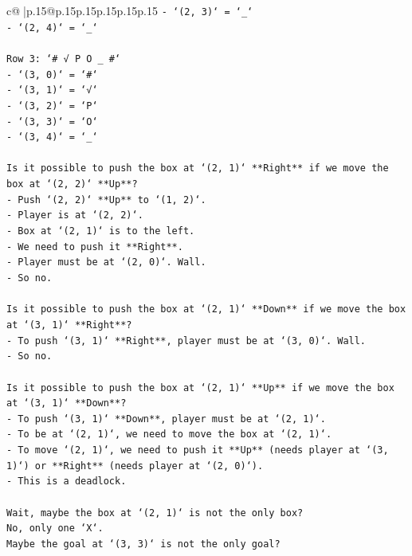 \documentclass{article}
\begin{document}
{\begin{supertabular}{c@{$\;$}|p{.15\linewidth}@{}p{.15\linewidth}p{.15\linewidth}p{.15\linewidth}p{.15\linewidth}p{.15\linewidth}}
{{{\texttt{{-} `(2, 3)` = `\_`} \\
\texttt{{-} `(2, 4)` = `\_`} \\
\\ 
\texttt{Row 3: `\# √ P O \_ \#`} \\
\texttt{{-} `(3, 0)` = `\#`} \\
\texttt{{-} `(3, 1)` = `√`} \\
\texttt{{-} `(3, 2)` = `P`} \\
\texttt{{-} `(3, 3)` = `O`} \\
\texttt{{-} `(3, 4)` = `\_`} \\
\\ 
\texttt{Is it possible to push the box at `(2, 1)` **Right** if we move the box at `(2, 2)` **Up**?} \\
\texttt{{-} Push `(2, 2)` **Up** to `(1, 2)`.} \\
\texttt{{-} Player is at `(2, 2)`.} \\
\texttt{{-} Box at `(2, 1)` is to the left.} \\
\texttt{{-} We need to push it **Right**.} \\
\texttt{{-} Player must be at `(2, 0)`. Wall.} \\
\texttt{{-} So no.} \\
\\ 
\texttt{Is it possible to push the box at `(2, 1)` **Down** if we move the box at `(3, 1)` **Right**?} \\
\texttt{{-} To push `(3, 1)` **Right**, player must be at `(3, 0)`. Wall.} \\
\texttt{{-} So no.} \\
\\ 
\texttt{Is it possible to push the box at `(2, 1)` **Up** if we move the box at `(3, 1)` **Down**?} \\
\texttt{{-} To push `(3, 1)` **Down**, player must be at `(2, 1)`.} \\
\texttt{{-} To be at `(2, 1)`, we need to move the box at `(2, 1)`.} \\
\texttt{{-} To move `(2, 1)`, we need to push it **Up** (needs player at `(3, 1)`) or **Right** (needs player at `(2, 0)`).} \\
\texttt{{-} This is a deadlock.} \\
\\ 
\texttt{Wait, maybe the box at `(2, 1)` is not the only box?} \\
\texttt{No, only one `X`.} \\
\texttt{Maybe the goal at `(3, 3)` is not the only goal?} \\
}}}
\end{supertabular}}
\end{document}
